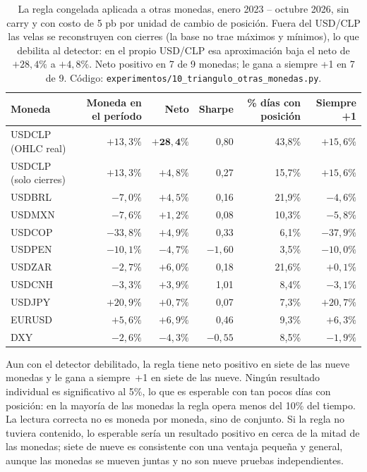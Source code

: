 \documentclass[10pt,a4paper]{article}
\newcommand{\ruta}[1]{\nolinkurl{#1}}
\begin{document}
\begin{table}[htbp]\centering\small
\begin{tabular}{@{}lrrrrr@{}}
\toprule
Moneda & Moneda en el período & Neto & Sharpe & \% días con posición & Siempre +1 \\
\midrule
USDCLP (OHLC real)    & $+13{,}3\%$ & $\mathbf{+28{,}4\%}$ & 0,80 & 43,8\% & $+15{,}6\%$ \\
USDCLP (solo cierres) & $+13{,}3\%$ & $+4{,}8\%$  & 0,27     & 15,7\% & $+15{,}6\%$ \\
\midrule
USDBRL & $-7{,}0\%$  & $+4{,}5\%$ & 0,16     & 21,9\% & $-4{,}6\%$ \\
USDMXN & $-7{,}6\%$  & $+1{,}2\%$ & 0,08     & 10,3\% & $-5{,}8\%$ \\
USDCOP & $-33{,}8\%$ & $+4{,}9\%$ & 0,33     & 6,1\%  & $-37{,}9\%$ \\
USDPEN & $-10{,}1\%$ & $-4{,}7\%$ & $-1{,}60$ & 3,5\% & $-10{,}0\%$ \\
USDZAR & $-2{,}7\%$  & $+6{,}0\%$ & 0,18     & 21,6\% & $+0{,}1\%$ \\
USDCNH & $-3{,}3\%$  & $+3{,}9\%$ & 1,01     & 8,4\%  & $-3{,}1\%$ \\
USDJPY & $+20{,}9\%$ & $+0{,}7\%$ & 0,07     & 7,3\%  & $+20{,}7\%$ \\
EURUSD & $+5{,}6\%$  & $+6{,}9\%$ & 0,46     & 9,3\%  & $+6{,}3\%$ \\
DXY    & $-2{,}6\%$  & $-4{,}3\%$ & $-0{,}55$ & 8,5\% & $-1{,}9\%$ \\
\bottomrule
\end{tabular}
\caption{La regla congelada aplicada a otras monedas, enero 2023 -- octubre 2026,
sin carry y con costo de 5 pb por unidad de cambio de posición. Fuera del USD/CLP
las velas se reconstruyen con cierres (la base no trae máximos y mínimos), lo que
debilita al detector: en el propio USD/CLP esa aproximación baja el neto de
$+28{,}4\%$ a $+4{,}8\%$. Neto positivo en 7 de 9 monedas; le gana a siempre +1 en
7 de 9. Código: \ruta{experimentos/10_triangulo_otras_monedas.py}.}\label{tab:monedas}
\end{table}

Aun con el detector debilitado, la regla tiene neto positivo en siete de las nueve
monedas y le gana a siempre~+1 en siete de las nueve. Ningún resultado individual
es significativo al 5\%, lo que es esperable con tan pocos días con posición: en la
mayoría de las monedas la regla opera menos del 10\% del tiempo. La lectura correcta
no es moneda por moneda, sino de conjunto. Si la regla no tuviera contenido, lo
esperable sería un resultado positivo en cerca de la mitad de las monedas; siete de
nueve es consistente con una ventaja pequeña y general, aunque las monedas se
mueven juntas y no son nueve pruebas independientes.
\end{document}
